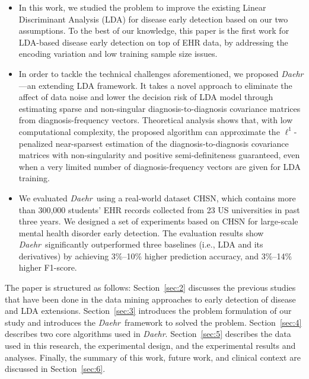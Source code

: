 \documentclass[journal,compsoc]{IEEEtran}
\newcommand{\TheName}{\mbox{\emph{Daehr}}}
\begin{document}
\begin{itemize}

    \item In this work, we studied the problem to improve the existing Linear Discriminant Analysis (LDA) for disease early detection based on our two assumptions.
To the best of our knowledge, this paper is the first work for LDA-based disease early detection on top of EHR data, by addressing the encoding variation and low training sample size issues.


\item In order to tackle the technical challenges aforementioned, we proposed \TheName---an extending LDA framework.
It takes a novel approach to eliminate the affect of data noise and lower the decision risk of LDA model  through estimating sparse and non-singular diagnosis-to-diagnosis covariance matrices from diagnosis-frequency vectors.
Theoretical analysis shows that, with low computational complexity, the proposed algorithm can approximate the $\ell^1$-penalized near-sparsest estimation of the diagnosis-to-diagnosis covariance matrices with non-singularity and positive semi-definiteness guaranteed, even when a very limited number of diagnosis-frequency vectors are given for LDA training.


\item We evaluated \TheName\ using a real-world dataset CHSN,  which contains more than 300,000 students' EHR records collected from 23 US universities in past three years.
We designed a set of experiments based on CHSN for large-scale mental health disorder early detection.
The evaluation results show \TheName\ significantly outperformed three baselines (i.e., LDA and its derivatives) by achieving 3\%--10\% higher prediction accuracy, and 3\%--14\% higher F1-score.


\end{itemize}


The paper is structured as follows: Section~\ref{sec:2} discusses the previous studies that have been done in the data mining approaches to early detection of disease and LDA extensions.
Section~\ref{sec:3} introduces the problem formulation of our study and introduces the  \TheName\ framework to solved the problem.
Section~\ref{sec:4} describes two core algorithms used in \TheName.
Section~\ref{sec:5} describes the data used in this research, the experimental design, and the experimental results and analyses.
Finally, the summary of this work, future work, and clinical context are discussed in Section~\ref{sec:6}.
\end{document}
